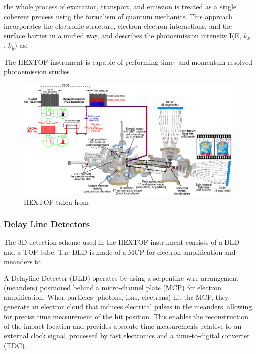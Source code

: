 the whole process of excitation, transport, and emission is treated as a single coherent process using the formalism of quantum mechanics. This approach incorporates the electronic structure, electron-electron interactions, and the surface barrier in a unified way, and describes the photoemission intensity  I(E, $k_x$, $k_y$)  as:





The \gls{HEXTOF} instrument is capable of performing time- and momentum-resolved photoemission studies 
\begin{figure}
    \centering
    \includegraphics[width=1\linewidth]{images/2024-08-27-10-50-01.png}
    \caption{HEXTOF taken from \cite{kutnyakhovTimeMomentumresolvedPhotoemission2020}}
\end{figure}

\subsubsection{Delay Line Detectors}
The 3D detection scheme used in the \gls{HEXTOF} instrument consists of a \gls{DLD} and a \gls{TOF} tube. The \gls{DLD} is made of a \gls{MCP} for electron amplification and meanders to 

A Delayline Detector (DLD) operates by using a serpentine wire arrangement (meanders) positioned behind a micro-channel plate (MCP) for electron amplification. When particles (photons, ions, electrons) hit the MCP, they generate an electron cloud that induces electrical pulses in the meanders, allowing for precise time measurement of the hit position. This enables the reconstruction of the impact location and provides absolute time measurements relative to an external clock signal, processed by fast electronics and a time-to-digital converter (TDC).

